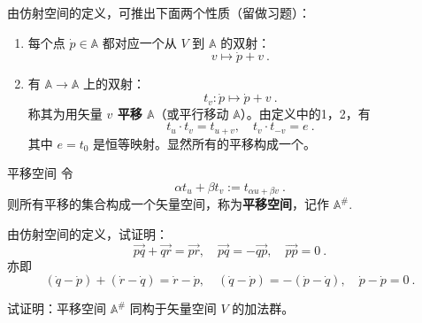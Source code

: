 由仿射空间的定义，可推出下面两个性质（留做习题）：
\begin{enumerate}
\item 每个点 $\dot p\in \mathbb A$ 都对应一个从 $V$ 到 $\mathbb A$ 的双射：
\begin{equation}\label{eq_AfSp_4}
v\mapsto \dot p+v~.
\end{equation}


\item 有 $\mathbb A\rightarrow\mathbb A$ 上的双射：
\begin{equation}\label{eq_AfSp_3}
t_v:\dot p\mapsto\dot p+v~.
\end{equation}
 称其为用矢量 \textbf{$v$ 平移 $\mathbb A$}（或平行移动 $\mathbb A$）。由定义中的1，2，有
 \begin{equation}
 t_u\cdot t_v=t_{u+v},\quad t_v\cdot t_{-v}=e~.
 \end{equation}
  其中 $e=t_0$ 是恒等映射。显然所有的平移构成一个。
\end{enumerate}
\begin{definition}{平移空间}
令
\begin{equation}
\alpha t_u+\beta t_v:= t_{\alpha u+\beta v}~.
\end{equation}
则所有平移的集合构成一个矢量空间，称为\textbf{平移空间}，记作 $\mathbb A^{\#}$.
\end{definition}
\begin{example}{}
由仿射空间的定义，试证明：
\begin{equation}
\overrightarrow{pq}+\overrightarrow{qr}=\overrightarrow{pr},\quad \overrightarrow{pq}=-\overrightarrow{qp},\quad\overrightarrow{pp}=0~.
\end{equation}
亦即
\begin{equation}
(\dot q-\dot p )+(\dot r-\dot q)=\dot r-\dot p,\quad(\dot q-\dot p)=-(\dot p-\dot q),\quad\dot p-\dot p=0~.
\end{equation}
\end{example}

\begin{exercise}{}\label{exe_AfSp_1}
试证明：平移空间 $\mathbb A^{\#}$ 同构于矢量空间 $V$ 的加法群。
\end{exercise}

